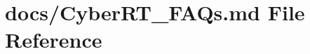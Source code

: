\hypertarget{CyberRT__FAQs_8md}{\section{docs/\-Cyber\-R\-T\-\_\-\-F\-A\-Qs.md File Reference}
\label{CyberRT__FAQs_8md}
}
